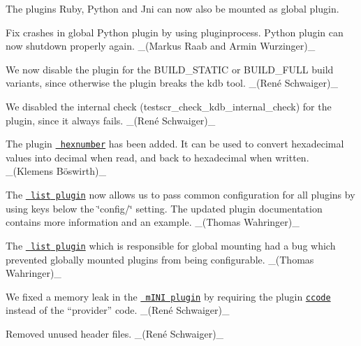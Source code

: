 \begin{DoxyItemize}
\item The plugins Ruby, Python and Jni can now also be mounted as global plugin.
\item Fix crashes in global Python plugin by using pluginprocess. Python plugin can now shutdown properly again. \+\_\+(\+Markus Raab and Armin Wurzinger)\+\_\+
\end{DoxyItemize}


\begin{DoxyItemize}
\item We now disable the plugin for the {\ttfamily B\+U\+I\+L\+D\+\_\+\+S\+T\+A\+T\+IC} or {\ttfamily B\+U\+I\+L\+D\+\_\+\+F\+U\+LL} build variants, since otherwise the plugin breaks the {\ttfamily kdb} tool. \+\_\+(René Schwaiger)\+\_\+
\item We disabled the internal check ({\ttfamily testscr\+\_\+check\+\_\+kdb\+\_\+internal\+\_\+check}) for the plugin, since it always fails. \+\_\+(René Schwaiger)\+\_\+
\end{DoxyItemize}


\begin{DoxyItemize}
\item The plugin \href{https://www.libelektra.org/plugins/hexnumber}{\texttt{ hexnumber}} has been added. It can be used to convert hexadecimal values into decimal when read, and back to hexadecimal when written. \+\_\+(Klemens Böswirth)\+\_\+
\end{DoxyItemize}


\begin{DoxyItemize}
\item The \href{http://libelektra.org/plugins/list}{\texttt{ {\ttfamily list} plugin}} now allows us to pass common configuration for all plugins by using keys below the \char`\"{}config/\char`\"{} setting. The updated plugin documentation contains more information and an example. \+\_\+(\+Thomas Wahringer)\+\_\+
\item The \href{http://libelektra.org/plugins/list}{\texttt{ {\ttfamily list} plugin}} which is responsible for global mounting had a bug which prevented globally mounted plugins from being configurable. \+\_\+(\+Thomas Wahringer)\+\_\+
\end{DoxyItemize}


\begin{DoxyItemize}
\item We fixed a memory leak in the \href{https://libelektra.org/plugins/mini}{\texttt{ m\+I\+NI plugin}} by requiring the plugin \href{https://libelektra.org/plugins/ccode}{\texttt{ {\ttfamily ccode}}} instead of the “provider” {\ttfamily code}. \+\_\+(René Schwaiger)\+\_\+
\item Removed unused header files. \+\_\+(René Schwaiger)\+\_\+
\end{DoxyItemize}


